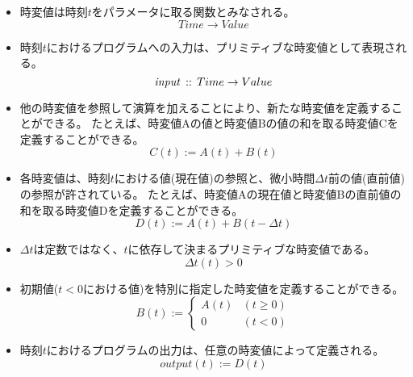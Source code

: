 \begin{itemize}
  \item
  時変値は時刻$t$をパラメータに取る関数とみなされる。
  \begin{equation*}
    Time \rightarrow Value
  \end{equation*}

  \item
  時刻$t$におけるプログラムへの入力は、プリミティブな時変値として表現される。
  \begin{equation*}
    {\it input} \, :: \, Time \rightarrow Value
  \end{equation*}

  \item
  他の時変値を参照して演算を加えることにより、新たな時変値を定義することができる。
  たとえば、時変値Aの値と時変値Bの値の和を取る時変値Cを定義することができる。
  \begin{equation*}
    C(t) := A(t) + B(t)
  \end{equation*}

  \item
  各時変値は、時刻$t$における値(現在値)の参照と、微小時間$ \Delta t $前の値(直前値)の参照が許されている。
  たとえば、時変値Aの現在値と時変値Bの直前値の和を取る時変値Dを定義することができる。
  \begin{equation*}
    D(t) := A(t) + B(t - \Delta t)
  \end{equation*}

  \item
  $ \Delta t $は定数ではなく、$t$に依存して決まるプリミティブな時変値である。
  \begin{equation*}
    \Delta t(t) > 0
  \end{equation*}

  \item
  初期値($ t < 0 $における値)を特別に指定した時変値を定義することができる。
  \begin{equation*}
    B(t) := \begin{cases}
      A(t) & (t \geq 0) \\
      0 & (t < 0)
    \end{cases}
  \end{equation*}

  \item
  時刻$t$におけるプログラムの出力は、任意の時変値によって定義される。
  \begin{equation*}
    output(t) := D(t)
  \end{equation*}
\end{itemize}

